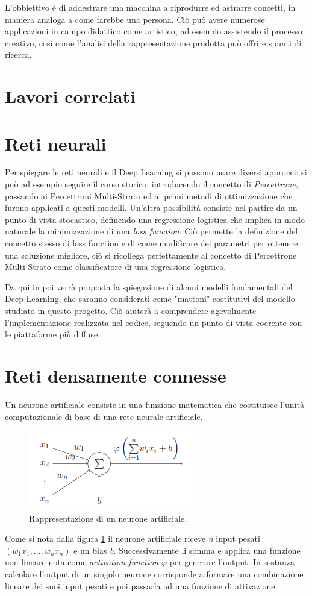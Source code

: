 L'obbiettivo è di addestrare una macchina a riprodurre ed astrarre concetti, in maniera analoga a come farebbe una persona. Ciò può avere numerose applicazioni in campo didattico come artistico, ad esempio assistendo il processo creativo, così come l'analisi della rappresentazione prodotta può offrire spunti di ricerca.
\section{Lavori correlati}

\section{Reti neurali}
Per spiegare le reti neurali e il Deep Learning si possono usare diversi approcci: si può ad esempio seguire il corso storico, introducendo il concetto di \textit{Percettrone}, passando ai Percettroni Multi-Strato ed ai primi metodi di ottimizzazione che furono applicati a questi modelli. Un'altra possibilità consiste nel partire da un punto di vista stocastico, definendo una regressione logistica che implica in modo naturale la minimizzazione di una \textit{loss function}. Ciò permette la definizione del concetto stesso di loss function e di come modificare dei parametri per ottenere una soluzione migliore, ciò si ricollega perfettamente al concetto di Percettrone Multi-Strato come classificatore di una regressione logistica.

Da qui in poi verrà proposta la spiegazione di alcuni modelli fondamentali del Deep Learning, che saranno considerati come "mattoni" costitutivi del modello studiato in questo progetto. Ciò aiuterà a comprendere agevolmente l'implementazione realizzata nel codice, seguendo un punto di vista coerente con le piattaforme più diffuse.
\section{Reti densamente connesse} %
\label{sec:reti_densamente_connesse}
Un neurone artificiale consiste in una funzione matematica che costituisce l'unità computazionale di base di una rete neurale artificiale.
\begin{figure}[h]
	\centering
	\includegraphics{img/artificial_neuron.png}
	\caption{Rappresentazione di un neurone artificiale.}
	\label{fig:1.2}
\end{figure}
Come si nota dalla figura \ref{fig:1.2} il neurone artificiale riceve \emph{n} input pesati $(w_1x_1,...,w_nx_n)$ e un bias \emph{b}. Successivamente li somma e applica una funzione non lineare nota come \textit{activation function} $\varphi$ per generare l'output. In sostanza calcolare l'output di un singolo neurone corrisponde a formare una combinazione lineare dei suoi input pesati e poi passarla ad una funzione di attivazione.

